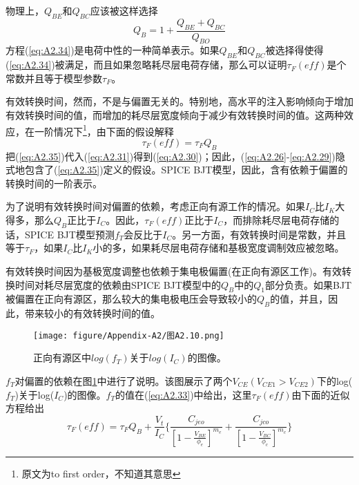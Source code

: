 物理上，$Q_{BE}$和$Q_{BC}$应该被这样选择
\begin{equation}
    Q_B = 1 + \frac{Q_{BE}+Q_{BC}}{Q_{BO}}
    \label{eq:A2.34}
\end{equation}
方程(\ref{eq:A2.34})是电荷中性的一种简单表示。如果$Q_{BE}$和$Q_{BC}$被选择得使得(\ref{eq:A2.34})被满足，而且如果忽略耗尽层电荷存储，那么可以证明$\tau_F(eff)$是个常数并且等于模型参数$\tau_F$。

有效转换时间，然而，不是与偏置无关的。特别地，高水平的注入影响倾向于增加有效转换时间\cite{ref-88,ref-89}的值，而增加的耗尽层宽度倾向于减少有效转换时间\cite{ref-79}的值。这两种效应，在一阶情况下\footnote{原文为to first order，不知道其意思}，由下面的假设解释
\begin{equation}
    \tau_F(eff) = \tau_FQ_B
    \label{eq:A2.35}
\end{equation}
把(\ref{eq:A2.35})代入(\ref{eq:A2.31})得到(\ref{eq:A2.30})；因此，(\ref{eq:A2.26}-\ref{eq:A2.29})隐式地包含了(\ref{eq:A2.35})定义的假设。SPICE BJT模型，因此，含有依赖于偏置的转换时间的一阶表示。

为了说明有效转换时间对偏置的依赖，考虑正向有源工作的情况。如果$I_C$比$I_K$大得多，那么$Q_B$正比于$I_C$。因此，$\tau_F(eff)$正比于$I_C$，而排除耗尽层电荷存储的话，SPICE BJT模型预测$f_T$会反比于$I_C$。另一方面，有效转换时间是常数，并且等于$\tau_F$，如果$I_C$比$I_K$小的多，如果耗尽层电荷存储和基极宽度调制效应被忽略。

有效转换时间因为基极宽度调整\cite{ref-79}也依赖于集电极偏置(在正向有源区工作)。有效转换时间对耗尽层宽度的依赖由SPICE BJT模型中的$Q_B$中的$Q_1$部分负责。如果BJT被偏置在正向有源区，那么较大的集电极电压会导致较小的$Q_B$的值，并且，因此，带来较小的有效转换时间的值。

\begin{figure}[htbp]
\small
    \centering
    \texttt{[image: figure/Appendix-A2/图A2.10.png]}
    \caption{正向有源区中$log(f_T)$关于$log(I_C)$的图像。}
    \label{图A2.10}
\end{figure}

$f_T$对偏置的依赖在图\ref{图A2.10}中进行了说明。该图展示了两个$V_{CE}(V_{CE1}>V_{CE2})$下的log($f_T$)关于log($I_C$)的图像。$f_T$的值在(\ref{eq:A2.33})中给出，这里$\tau_F(eff)$由下面的近似方程给出
\begin{equation}
    \tau_F(eff) = \tau_FQ_B + \frac{V_t}{I_C}\{\frac{C_{jeo}}{[1-\frac{V_{BE}}{\phi_e}]^{m_e}} + \frac{C_{jco}}{[1-\frac{V_{BC}}{\phi_c}]^{m_c}}\}
    \label{eq:A2.36}
\end{equation}

